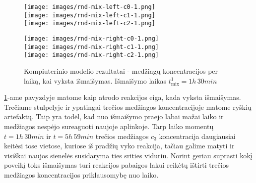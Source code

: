 \begin{figure}[h]
    \centering
    \begin{minipage}[c]{0.40\textwidth}
        \centering
        \texttt{[image: images/rnd-mix-left-c0-1.png]}\\
        \texttt{[image: images/rnd-mix-left-c1-1.png]}\\
        \texttt{[image: images/rnd-mix-left-c2-1.png]}
    \end{minipage}%
    \hfill
    \begin{minipage}[c]{0.1\textwidth}
        \centering
    \end{minipage}%
    \hfill
    \begin{minipage}[c]{0.45\textwidth}
        \centering
        \texttt{[image: images/rnd-mix-right-c0-1.png]}\\
        \texttt{[image: images/rnd-mix-right-c1-1.png]}\\
        \texttt{[image: images/rnd-mix-right-c2-1.png]}
    \end{minipage}

    \caption{Kompiuterinio modelio rezultatai - medžiagų koncentracijos per laiką, kai vyksta išmaišymas. Išmaišymo laikas $t^1_\text{mix} = 1h\,30min$ }

    \label{mix-example}

\end{figure}

\ref{mix-example}-ame pavyzdyje matome kaip atrodo reakcijos eiga, kada vyksta išmaišymas. Trečiame stulpelyje ir ypatingai trečios medžiagos koncentracijoje matome ryškių artefaktų. Taip yra todėl, kad nuo išmaišymo praejo labai mažai laiko ir medžiagos nespėjo sureaguoti naujoje aplinkoje. Tarp laiko momentų $t=1h\,30min$ ir $t=5h\,59min$ trečios medžiagos $c_3$ koncentracija daugiausiai keitėsi tose vietose, kuriose iš pradžių vyko reakcija, tačiau galime matyti ir visiškai naujos sienelės susidaryma ties srities viduriu. Norint geriau suprasti kokį poveikį toks išmaišymas turi reakcijos pabaigos lakui reikėtų ištirti trečios medžiagos koncentracijos priklausomybę nuo laiko.

